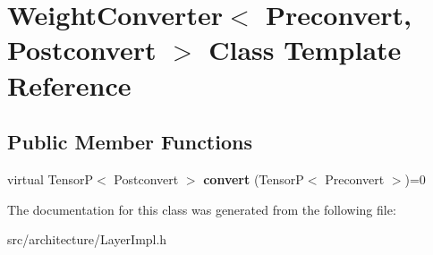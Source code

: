 \hypertarget{classWeightConverter}{}\section{Weight\+Converter$<$ Preconvert, Postconvert $>$ Class Template Reference}
\label{classWeightConverter}
\subsection*{Public Member Functions}
\begin{DoxyCompactItemize}
\item 
\mbox{\label{classWeightConverter_ad22e7c2b0170edaf9830b727eebe1d18}} 
virtual TensorP$<$ Postconvert $>$ {\bfseries convert} (TensorP$<$ Preconvert $>$)=0
\end{DoxyCompactItemize}


The documentation for this class was generated from the following file\+:\begin{DoxyCompactItemize}
\item 
src/architecture/Layer\+Impl.\+h\end{DoxyCompactItemize}
